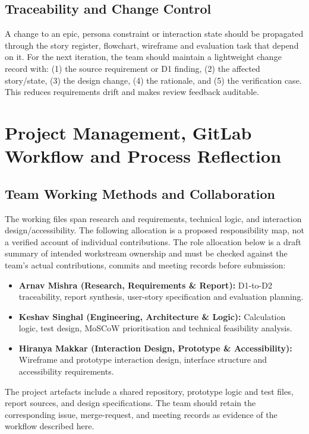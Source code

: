 \documentclass[12pt,a4paper]{article}
\begin{document}
\subsection{Traceability and Change Control}
A change to an epic, persona constraint or interaction state should be propagated through the story register, flowchart, wireframe and evaluation task that depend on it. For the next iteration, the team should maintain a lightweight change record with: (1) the source requirement or D1 finding, (2) the affected story/state, (3) the design change, (4) the rationale, and (5) the verification case. This reduces requirements drift and makes review feedback auditable.

\section{Project Management, GitLab Workflow and Process Reflection}

\subsection{Team Working Methods and Collaboration}
The working files span research and requirements, technical logic, and interaction design/accessibility. The following allocation is a proposed responsibility map, not a verified account of individual contributions. The role allocation below is a draft summary of intended workstream ownership and must be checked against the team's actual contributions, commits and meeting records before submission:
\begin{itemize}[leftmargin=*]
  \item \textbf{Arnav Mishra (Research, Requirements \& Report):} D1-to-D2 traceability, report synthesis, user-story specification and evaluation planning.
  \item \textbf{Keshav Singhal (Engineering, Architecture \& Logic):} Calculation logic, test design, MoSCoW prioritisation and technical feasibility analysis.
  \item \textbf{Hiranya Makkar (Interaction Design, Prototype \& Accessibility):} Wireframe and prototype interaction design, interface structure and accessibility requirements.
\end{itemize}
The project artefacts include a shared repository, prototype logic and test files, report sources, and design specifications. The team should retain the corresponding issue, merge-request, and meeting records as evidence of the workflow described here.
\end{document}
